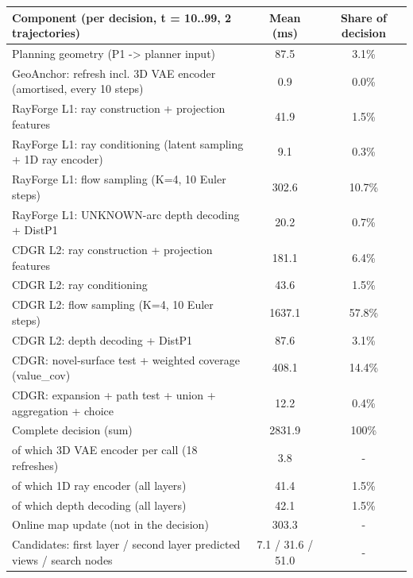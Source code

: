 \begin{tabular}{@{}lcc@{}}
\toprule
Component (per decision, t = 10..99, 2 trajectories) & Mean (ms) & Share of decision \\
\midrule
Planning geometry (P1 -> planner input) & 87.5 & 3.1\% \\
GeoAnchor: refresh incl. 3D VAE encoder (amortised, every 10 steps) & 0.9 & 0.0\% \\
RayForge L1: ray construction + projection features & 41.9 & 1.5\% \\
RayForge L1: ray conditioning (latent sampling + 1D ray encoder) & 9.1 & 0.3\% \\
RayForge L1: flow sampling (K=4, 10 Euler steps) & 302.6 & 10.7\% \\
RayForge L1: UNKNOWN-arc depth decoding + DistP1 & 20.2 & 0.7\% \\
CDGR L2: ray construction + projection features & 181.1 & 6.4\% \\
CDGR L2: ray conditioning & 43.6 & 1.5\% \\
CDGR L2: flow sampling (K=4, 10 Euler steps) & 1637.1 & 57.8\% \\
CDGR L2: depth decoding + DistP1 & 87.6 & 3.1\% \\
CDGR: novel-surface test + weighted coverage (value\_cov) & 408.1 & 14.4\% \\
CDGR: expansion + path test + union + aggregation + choice & 12.2 & 0.4\% \\
Complete decision (sum) & 2831.9 & 100\% \\
  of which 3D VAE encoder per call (18 refreshes) & 3.8 & - \\
  of which 1D ray encoder (all layers) & 41.4 & 1.5\% \\
  of which depth decoding (all layers) & 42.1 & 1.5\% \\
Online map update (not in the decision) & 303.3 & - \\
Candidates: first layer / second layer predicted views / search nodes & 7.1 / 31.6 / 51.0 & - \\
\bottomrule
\end{tabular}
